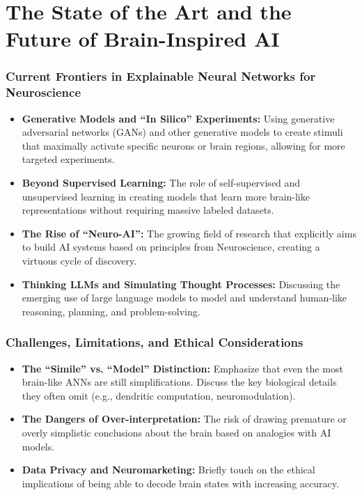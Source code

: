 \part{The State of the Art and the Future of Brain-Inspired AI}

\section{Current Frontiers in Explainable Neural Networks for Neuroscience}
\begin{itemize}
    \item \textbf{Generative Models and ``In Silico'' Experiments:} Using generative adversarial networks (GANs) and other generative models to create stimuli that maximally activate specific neurons or brain regions, allowing for more targeted experiments.
    \item \textbf{Beyond Supervised Learning:} The role of self-supervised and unsupervised learning in creating models that learn more brain-like representations without requiring massive labeled datasets.
    \item \textbf{The Rise of ``Neuro-AI'':} The growing field of research that explicitly aims to build AI systems based on principles from Neuroscience, creating a virtuous cycle of discovery.
    \item \textbf{Thinking LLMs and Simulating Thought Processes:} Discussing the emerging use of large language models to model and understand human-like reasoning, planning, and problem-solving.
\end{itemize}

\section{Challenges, Limitations, and Ethical Considerations}
\begin{itemize}
    \item \textbf{The ``Simile'' vs. ``Model'' Distinction:} Emphasize that even the most brain-like ANNs are still simplifications. Discuss the key biological details they often omit (e.g., dendritic computation, neuromodulation).
    \item \textbf{The Dangers of Over-interpretation:} The risk of drawing premature or overly simplistic conclusions about the brain based on analogies with AI models.
    \item \textbf{Data Privacy and Neuromarketing:} Briefly touch on the ethical implications of being able to decode brain states with increasing accuracy.
\end{itemize}

